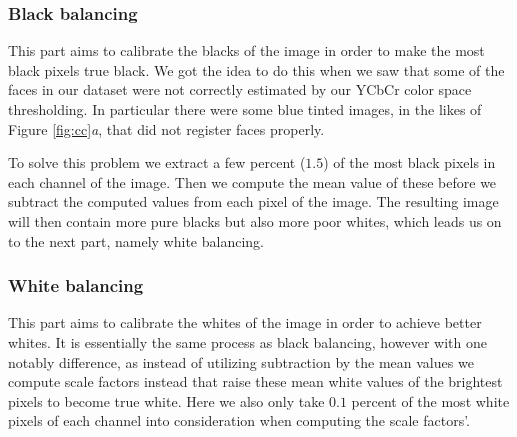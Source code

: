 \subsubsection{Black balancing}
This part aims to calibrate the blacks of the image in order to make the most black pixels true black. We got the idea to do this when we saw that some of the faces in our dataset were not correctly estimated by our YCbCr color space thresholding. In particular there were some blue tinted images, in the likes of  Figure \ref{fig:cc}\textit{a}, that did not register faces properly. 

To solve this problem we extract a few percent ($1.5$) of the most black pixels in each channel of the image. Then we compute the mean value of these before we subtract the computed values from each pixel of the image. The resulting image will then contain more pure blacks but also more poor whites, which leads us on to the next part, namely white balancing.


\subsubsection{White balancing}
This part aims to calibrate the whites of the image in order to achieve better whites. It is essentially the same process as black balancing, however with one notably difference, as instead of utilizing subtraction by the mean values we compute scale factors instead that raise these mean white values of the brightest pixels to become true white. Here we also only take $0.1$ percent of the most white pixels of each channel into consideration when computing the scale factors'.


